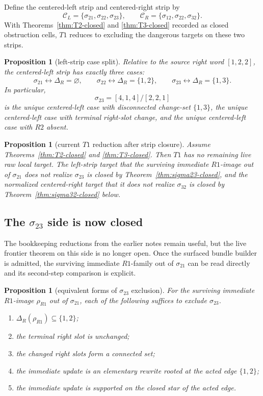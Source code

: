 \documentclass[11pt]{article}
\newtheorem{proposition}[theorem]{Proposition}
\newcommand{\sig}[2]{\sigma_{#1#2}}
\newcommand{\CL}{\mathcal C_L}
\newcommand{\CR}{\mathcal C_R}
\newcommand{\RhoR}{\rho_{R1}}
\begin{document}
Define the centered-left strip and centered-right strip by
\[
\CL=\{\sig21,\sig22,\sig23\},
\qquad
\CR=\{\sig12,\sig22,\sig32\}.
\]
With Theorems~\ref{thm:T2-closed} and \ref{thm:T3-closed} recorded as
closed obstruction cells, \(T1\) reduces to excluding the dangerous targets
on these two strips.

\begin{proposition}[left-strip case split]
\label{prop:left-strip-case-split}
Relative to the source right word \([1,2,2]\), the centered-left strip has
exactly three cases:
\[
\sig21 \leftrightarrow \Delta_R=\varnothing,\qquad
\sig22 \leftrightarrow \Delta_R=\{1,2\},\qquad
\sig23 \leftrightarrow \Delta_R=\{1,3\}.
\]
In particular,
\[
\sig23=[4,1,4]/[2,2,1]
\]
is the unique centered-left case with disconnected change-set \(\{1,3\}\), the
unique centered-left case with terminal right-slot change, and the unique
centered-left case with \(R2\) absent.
\end{proposition}

\begin{proposition}[current \(T1\) reduction after strip closure]
\label{prop:T1-current-reduction}
Assume Theorems~\ref{thm:T2-closed} and \ref{thm:T3-closed}.
Then \(T1\) has no remaining live raw local target.
The left-strip target that the surviving immediate \(R1\)-image out of
\(\sig21\) does not realize \(\sig23\) is closed by
Theorem~\ref{thm:sigma23-closed}, and the normalized centered-right target that
it does not realize \(\sig32\) is closed by
Theorem~\ref{thm:sigma32-closed} below.
\end{proposition}

\subsection{The \texorpdfstring{$\sig23$}{sigma23} side is now closed}

The bookkeeping reductions from the earlier notes remain useful, but the live
frontier theorem on this side is no longer open.  Once the surfaced bundle
builder is admitted, the surviving immediate \(R1\)-family out of \(\sig21\)
can be read directly and its second-step comparison is explicit.

\begin{proposition}[equivalent forms of \(\sig23\) exclusion]
\label{prop:sigma23-equivalences}
For the surviving immediate \(R1\)-image \(\RhoR\) out of \(\sig21\), each of the
following suffices to exclude \(\sig23\).
\begin{enumerate}[label=\textup{(\arabic*)},leftmargin=2.8em]
\item \(\Delta_R(\RhoR)\subseteq\{1,2\}\);
\item the terminal right slot is unchanged;
\item the changed right slots form a connected set;
\item the immediate update is an elementary rewrite rooted at the acted edge
      \(\{1,2\}\);
\item the immediate update is supported on the closed star of the acted edge.
\end{enumerate}
\end{proposition}
\end{document}
